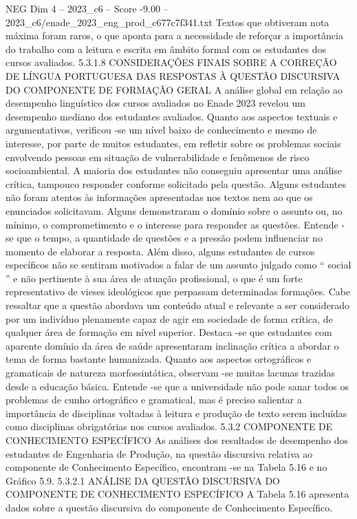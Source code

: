 \begin{textsample}{NEG Dim 4 – 2023\_c6 – Score -9.00 – 2023\_c6/enade\_2023\_eng\_prod\_c677c7f341.txt}
Textos que obtiveram nota máxima foram raros, o que aponta para a necessidade de reforçar a importância do trabalho com a leitura e escrita em âmbito formal com os estudantes dos cursos avaliados. 5.3.1.8 CONSIDERAÇÕES FINAIS SOBRE A CORREÇÃO DE LÍNGUA PORTUGUESA DAS RESPOSTAS À QUESTÃO DISCURSIVA DO COMPONENTE DE FORMAÇÃO GERAL A análise global em relação ao desempenho linguístico dos cursos avaliados no Enade 2023 revelou um desempenho mediano dos estudantes avaliados.
Quanto aos aspectos textuais e argumentativos, verificou -se um nível baixo de conhecimento e mesmo de interesse, por parte de muitos estudantes, em refletir sobre os problemas sociais envolvendo pessoas em situação de vulnerabilidade e fenômenos de risco socioambiental.
A maioria dos estudantes não conseguiu apresentar uma análise crítica, tampouco responder conforme solicitado pela questão.
Alguns estudantes não foram atentos às informações apresentadas nos textos nem ao que os enunciados solicitavam.
Alguns demonstraram o domínio sobre o assunto ou, no mínimo, o comprometimento e o interesse para responder as questões.
Entende -se que o tempo, a quantidade de questões e a pressão podem influenciar no momento de elaborar a resposta.
Além disso, alguns estudantes de cursos específicos não se sentiram motivados a falar de um assunto julgado como “ social ” e não pertinente à sua área de atuação profissional, o que é um forte representativo de vieses ideológicos que perpassam determinadas formações.
Cabe ressaltar que a questão abordava um conteúdo atual e relevante a ser considerado por um indivíduo plenamente capaz de agir em sociedade de forma crítica, de qualquer área de formação em nível superior.
Destaca -se que estudantes com aparente domínio da área de saúde apresentaram inclinação crítica a abordar o tema de forma bastante humanizada.
Quanto aos aspectos ortográficos e gramaticais de natureza morfossintática, observam -se muitas lacunas trazidas desde a educação básica.
Entende -se que a universidade não pode sanar todos os problemas de cunho ortográfico e gramatical, mas é preciso salientar a importância de disciplinas voltadas à leitura e produção de texto serem incluídas como disciplinas obrigatórias nos cursos avaliados. 5.3.2 COMPONENTE DE CONHECIMENTO ESPECÍFICO As análises dos resultados de desempenho dos estudantes de Engenharia de Produção, na questão discursiva relativa ao componente de Conhecimento Específico, encontram -se na Tabela 5.16 e no Gráfico 5.9. 5.3.2.1 ANÁLISE DA QUESTÃO DISCURSIVA DO COMPONENTE DE CONHECIMENTO ESPECÍFICO A Tabela 5.16 apresenta dados sobre a questão discursiva do componente de Conhecimento Específico.

\end{textsample}

